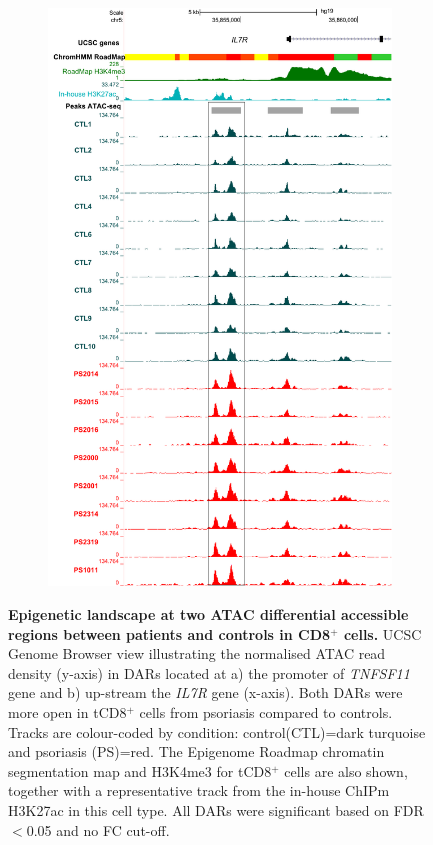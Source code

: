 \begin{figure}[htbp]
\begin{subfigure}{0.5\textwidth}
\includegraphics[width=\textwidth]{./Results2/pdfs/UCSC_ATAC_CD8_normalised_peak_enh_IL7R}
\caption{\textbf{}}
\end{subfigure}
\caption[Epigenetic landscape at two ATAC differential accessible regions between patients and controls in CD8$^+$ cells.]{\textbf{Epigenetic landscape at two ATAC differential accessible regions between patients and controls in CD8$^+$ cells.} UCSC Genome Browser view illustrating the normalised ATAC read density (y-axis) in DARs located at a) the promoter of \textit{TNFSF11} gene and b) up-stream the \textit{IL7R} gene (x-axis). Both DARs were more open in tCD8$^+$ cells from psoriasis compared to controls. Tracks are colour-coded by condition: control(CTL)=dark turquoise and psoriasis (PS)=red. The Epigenome Roadmap chromatin segmentation map and H3K4me3 for tCD8$^+$ cells are also shown, together with a representative track from the in-house ChIPm H3K27ac in this cell type. All DARs were significant based on FDR$<$0.05 and no FC cut-off.}
\label{figure:ATAC_PS_CTL_CD8_TNFSF11_IL7R_tracks}
\end{figure} 



